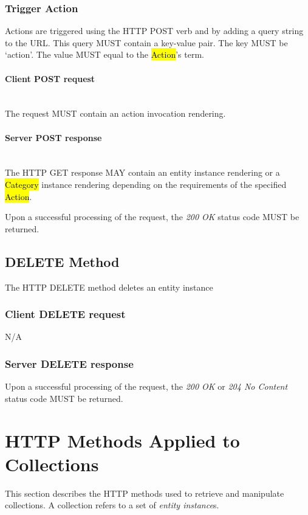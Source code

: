 \documentclass[10pt,a4paper]{article}
\begin{document}
\subsubsection{Trigger Action}
Actions are triggered using the HTTP POST verb and by adding a query string to the URL. This query MUST contain
a key-value pair. The key MUST be `action'. The value MUST equal to the \hl{Action}'s term.

\paragraph*{Client POST request}\hfill\\
The request MUST contain an action invocation rendering.

\paragraph*{Server POST response}\hfill\\
The HTTP GET response MAY contain an entity instance rendering or a \hl{Category} instance rendering
depending on the requirements of the specified \hl{Action}.

Upon a successful processing of the request, the \emph{200 OK} status code MUST be returned.

\subsection{DELETE Method}
The HTTP DELETE method deletes an entity instance

\subsubsection*{Client DELETE request}
N/A

\subsubsection*{Server DELETE response}
Upon a successful processing of the request, the \emph{200 OK} or \emph{204 No Content} status
code MUST be returned.

\section{HTTP Methods Applied to Collections}
\label{sec:http_methods_coll}

This section describes the HTTP methods used to retrieve and manipulate
collections. A collection refers to a set of {\em entity instance}s.
\end{document}
